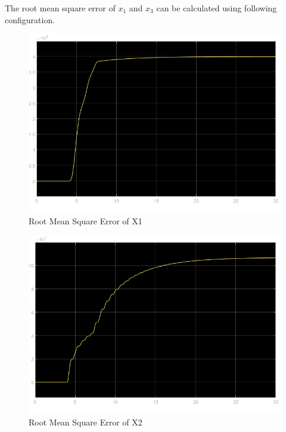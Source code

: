 \documentclass{article}
\begin{document}
The root mean square error of $x_1$ and $x_3$ can be calculated using following configuration.

\begin{figure}
    \centering
    \includegraphics[width=\linewidth]{images/RMSE(Of X1).png}
    \caption{Root Mean Square Error of X1}
    \label{fig:enter-label5}
\end{figure}

\begin{figure}
    \centering
    \includegraphics[width=\linewidth]{images/RMSE(Of X3).png}
    \caption{Root Mean Square Error of X2}
    \label{fig:enter-label6}
\end{figure}
\end{document}
